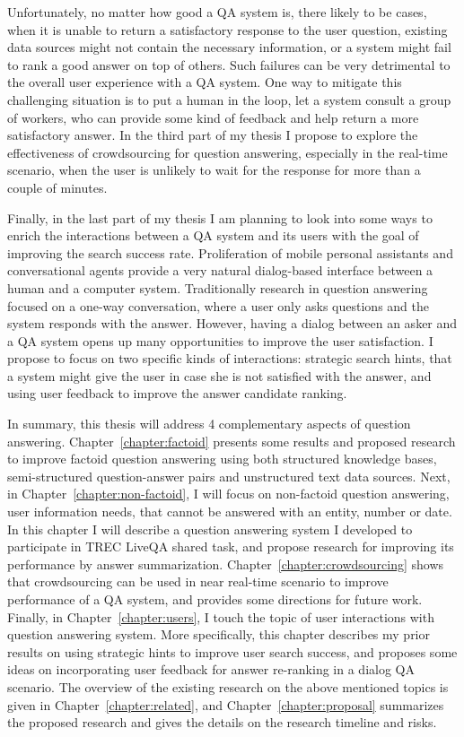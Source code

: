 Unfortunately, no matter how good a QA system is, there likely to be cases, when it is unable to return a satisfactory response to the user question, \eg existing data sources might not contain the necessary information, or a system might fail to rank a good answer on top of others.
Such failures can be very detrimental to the overall user experience with a QA system.
One way to mitigate this challenging situation is to put a human in the loop, \eg let a system consult a group of workers, who can provide some kind of feedback and help return a more satisfactory answer.
In the third part of my thesis I propose to explore the effectiveness of crowdsourcing for question answering, especially in the real-time scenario, when the user is unlikely to wait for the response for more than a couple of minutes.

Finally, in the last part of my thesis I am planning to look into some ways to enrich the interactions between a QA system and its users with the goal of improving the search success rate.
Proliferation of mobile personal assistants and conversational agents provide a very natural dialog-based interface between a human and a computer system.
Traditionally research in question answering focused on a one-way conversation, where a user only asks questions and the system responds with the answer.
However, having a dialog between an asker and a QA system opens up many opportunities to improve the user satisfaction.
I propose to focus on two specific kinds of interactions: strategic search hints, that a system might give the user in case she is not satisfied with the answer, and using user feedback to improve the answer candidate ranking.

In summary, this thesis will address 4 complementary aspects of question answering.
Chapter~\ref{chapter:factoid} presents some results and proposed research to improve factoid question answering using both structured knowledge bases, semi-structured question-answer pairs and unstructured text data sources.
Next, in Chapter~\ref{chapter:non-factoid}, I will focus on non-factoid question answering, \ie user information needs, that cannot be answered with an entity, number or date.
In this chapter I will describe a question answering system I developed to participate in TREC LiveQA shared task, and propose research for improving its performance by answer summarization.
Chapter~\ref{chapter:crowdsourcing} shows that crowdsourcing can be used in near real-time scenario to improve performance of a QA system, and provides some directions for future work.
Finally, in Chapter~\ref{chapter:users}, I touch the topic of user interactions with question answering system.
More specifically, this chapter describes my prior results on using strategic hints to improve user search success, and proposes some ideas on incorporating user feedback for answer re-ranking in a dialog QA scenario.
The overview of the existing research on the above mentioned topics is given in Chapter~\ref{chapter:related}, and Chapter~\ref{chapter:proposal} summarizes the proposed research and gives the details on the research timeline and risks.

